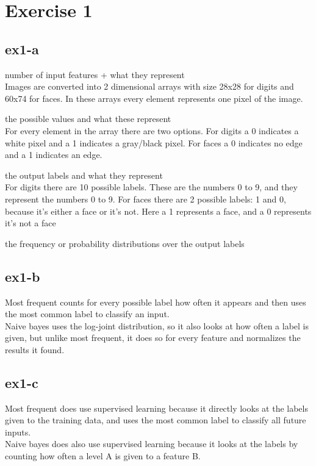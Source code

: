 \section{Exercise 1}
\label{sec:ex1}
\subsection{ex1-a}
number of input features + what they represent \\
Images are converted into 2 dimensional arrays with size 28x28 for digits and 60x74 for faces.
In these arrays every element represents one pixel of the image. 

the possible values and what these represent \\
For every element in the array there are two options. For digits a 0 indicates a white pixel
and a 1 indicates a gray/black pixel. For faces a 0 indicates no edge and a 1 indicates an edge.


the output labels and what they represent \\
For digits there are 10 possible labels. These are the numbers 0 to 9, and they represent 
the numbers 0 to 9.
For faces there are 2 possible labels: 1 and 0, because it's either a face or it's not. 
Here a 1 represents a face, and a 0 represents it's not a face

the frequency or probability distributions over the output labels \\

\subsection{ex1-b}
Most frequent counts for every possible label how often it appears and then uses the most
common label to classify an input.\\
Naive bayes uses the log-joint distribution, so it also looks at how often a label is given,
but unlike most frequent, it does so for every feature and normalizes the results it found.

\subsection{ex1-c}
Most frequent does use supervised learning because it directly looks at the labels given 
to the training data, and uses the most common label to classify all future inputs.\\
Naive bayes does also use supervised learning because it looks at the labels by counting 
how often a level A is given to a feature B.